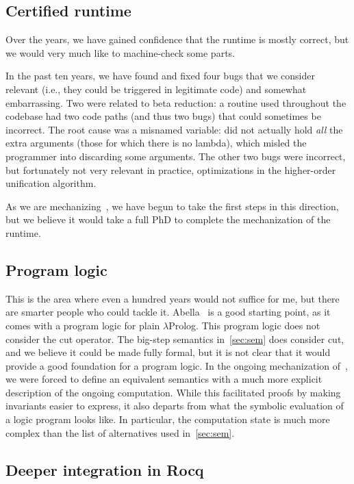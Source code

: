 \documentclass[a4paper, 11pt]{book}
\begin{document}
\subsection{Certified runtime}

Over the years, we have gained confidence that the runtime is mostly correct,
but we would very much like to machine-check some parts.

In the past ten years, we have found and fixed four bugs that we consider
relevant (i.e., they could be triggered in legitimate code) and somewhat
embarrassing. Two were related to beta reduction: a routine used throughout the
codebase had two code paths (and thus two bugs) that could sometimes be
incorrect. The root cause was a misnamed variable:  did not
actually hold \emph{all} the extra arguments (those for which there is no
lambda), which misled the programmer into discarding some arguments. The other
two bugs were incorrect, but fortunately not very relevant in practice,
optimizations in the higher-order unification algorithm.

As we are mechanizing~\cite{elpidet}, we have begun to take the first steps in
this direction, but we believe it would take a full PhD to complete the
mechanization of the runtime.

\subsection{Program logic}

This is the area where even a hundred years would not suffice for me, but there
are smarter people who could tackle it. Abella~\cite{abella} is a good starting
point, as it comes with a program logic for plain $\lambda$Prolog. This program
logic does not consider the cut operator. The big-step semantics
in~\cref{sec:sem} does consider cut, and we believe it could be made fully
formal, but it is not clear that it would provide a good foundation for a
program logic. In the ongoing mechanization of~\cite{elpidet}, we were forced
to define an equivalent semantics with a much more explicit description of the
ongoing computation. While this facilitated proofs by making invariants easier
to express, it also departs from what the symbolic evaluation of a logic
program looks like. In particular, the computation state is much more complex
than the list of alternatives used in~\cref{sec:sem}.

\subsection{Deeper integration in Rocq}
\end{document}
